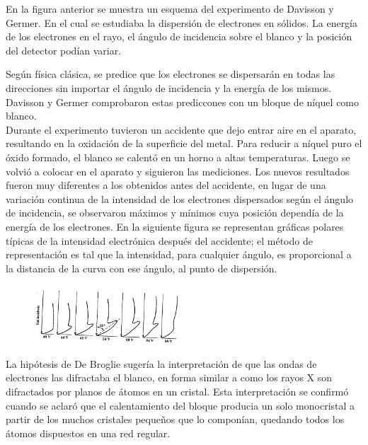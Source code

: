\documentclass[a4paper]{article}
\begin{document}
    \indent En la figura anterior se muestra un esquema del experimento de Davisson y Germer. En el cual se estudiaba la dispersión de electrones en sólidos. La energía de los electrones en el rayo, el ángulo de incidencia sobre el blanco y la posición del detector podían variar. \\

    \newpage
    \noindent
    \thispagestyle{fancy}

    \indent Según física clásica, se predice que los electrones se dispersarán en todas las direcciones sin importar el ángulo de incidencia y la energía de los mismos. Davisson y Germer comprobaron estas prediccones con un bloque de níquel como blanco.\\

    \indent Durante el experimento tuvieron un accidente que dejo entrar aire en el aparato, resultando en la oxidación de la superficie del metal. Para reducir a níquel puro el óxido formado, el blanco se calentó en un horno a altas temperaturas. Luego se volvió a colocar en el aparato y siguieron las mediciones. Los nuevos resultados fueron muy diferentes a los obtenidos antes del accidente, en lugar de una variación continua de la intensidad de los electrones dispersados según el ángulo de incidencia, se observaron máximos y mínimos cuya posición dependía de la energía de los electrones. En la siguiente figura se representan gráficas polares típicas de la intensidad electrónica después del accidente; el método de representación es tal que la intensidad, para cualquier ángulo, es proporcional a la distancia de la curva con ese ángulo, al punto de dispersión.

    \begin{figure}[h!]
        \centering
        \includegraphics[width = 5.5cm]{../imagenes/grafica.png}
    \end{figure}

    \indent La hipótesis de De Broglie sugería la interpretación de que las ondas de electrones las difractaba el blanco, en forma similar a como los rayos X son difractados por planos de átomos en un cristal. Esta interpretación se confirmó cuando se aclaró que el calentamiento del bloque producia un solo monocristal a partir de los muchos cristales pequeños que lo componían, quedando todos los átomos dispuestos en una red regular.
\end{document}
